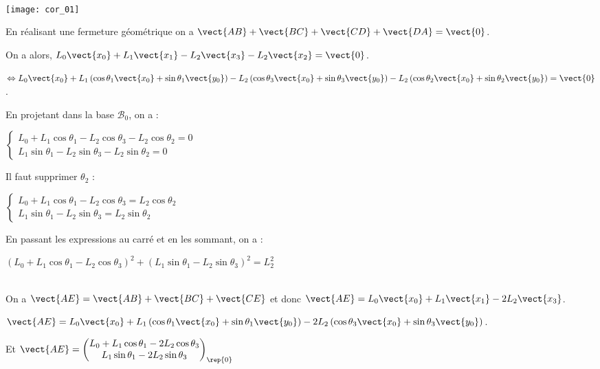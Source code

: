 \ifprof
\begin{corrige}~\\
\begin{center}
\texttt{[image: cor\_01]}
\end{center}

En réalisant une fermeture géométrique on a $\vect{AB}+\vect{BC}+\vect{CD}+\vect{DA}=\vect{0}$.

On a alors, $L_0\vect{x_0}+L_1\vect{x_1}-L_2\vect{x_3}-L_2\vect{x_2}=\vect{0}$.

$\Leftrightarrow L_0\vect{x_0}+L_1\left( \cos \theta_1 \vect{x_0}+ \sin \theta_1 \vect{y_0} \right)-L_2\left( \cos \theta_3\vect{x_0} + \sin \theta_3\vect{y_0}  \right)-L_2\left( \cos \theta_2\vect{x_0} + \sin \theta_2\vect{y_0}  \right)=\vect{0}$.

En projetant dans la base $\mathcal{B}_0$, on a :

$
\left\{
\begin{array}{l}
L_0 + L_1 \cos \theta_1 -L_2\cos \theta_3-L_2 \cos \theta_2=0 \\
L_1\sin \theta_1-L_2 \sin \theta_3-L_2 \sin \theta_2=0 
\end{array} \right.
$

Il faut supprimer $\theta_2$ :

$
\left\{
\begin{array}{l}
L_0 + L_1 \cos \theta_1 -L_2\cos \theta_3=L_2 \cos \theta_2 \\
L_1\sin \theta_1-L_2 \sin \theta_3=L_2 \sin \theta_2
\end{array} \right.
$

En passant les expressions au carré et en les sommant, on a :

$\left(L_0 + L_1 \cos \theta_1 -L_2\cos \theta_3\right)^2 + \left( L_1\sin \theta_1-L_2 \sin \theta_3\right)^2=L_2^2 $


\end{corrige}
\else
\fi

\ifprof
\begin{corrige}~\\
On a $\vect{AE}=\vect{AB}+\vect{BC}+\vect{CE}$ et donc 
 $\vect{AE}=L_0\vect{x_0}+L_1 \vect{x_1} -2L_2\vect{x_3}$. 
 
  $\vect{AE}=L_0\vect{x_0}+L_1\left( \cos \theta_1 \vect{x_0}+ \sin \theta_1 \vect{y_0} \right)-2L_2\left( \cos \theta_3\vect{x_0} + \sin \theta_3\vect{y_0}  \right)$. 
  
  Et $\vect{AE}=\begin{pmatrix} 
    L_0+L_1 \cos \theta_1 -2L_2\cos \theta_3 \\    
    L_1 \sin \theta_1 -2L_2 \sin \theta_3
  \end{pmatrix}_{\rep{0}}$
 
\end{corrige}
\else
\fi

